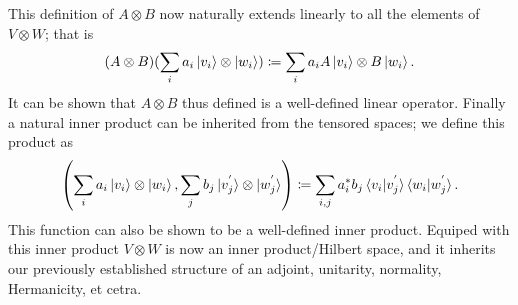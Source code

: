 \documentclass[12pt,twoside]{reedthesis}
\theoremstyle{plain}   %
\theoremstyle{definition}
\theoremstyle{remark}
\numberwithin{equation}{section}
\begin{document}
   This definition of $A \otimes B$ now naturally extends linearly to all the elements of $V \otimes W$; that is
   \[(A \otimes B) (\sum_i a_i \ket{v_i} \otimes \ket{w_i}) \coloneq \sum_i a_i A\ket{v_i} \otimes B\ket{w_i}.\]
   It can be shown that $A \otimes B$ thus defined is a well-defined linear operator.
   Finally a natural inner product can be inherited from the tensored spaces; we define this product as 
   \[ \left( \sum_i a_i \ket{v_i} \otimes \ket{w_i}, \sum_j b_j \ket{v^{'}_j} \otimes \ket{w^{'}_j}  \right) \coloneq
     \sum_{i, j} a_i^* b_j \braket{v_i  | v^{'}_j} \braket{w_i  | w^{'}_j}. \]
   This function can also be shown to be a well-defined inner product. Equiped with this inner product $V \otimes W$ is now an inner product/Hilbert space, and it inherits our previously established structure of
   an adjoint, unitarity, normality, Hermanicity, et cetra.
\end{document}
